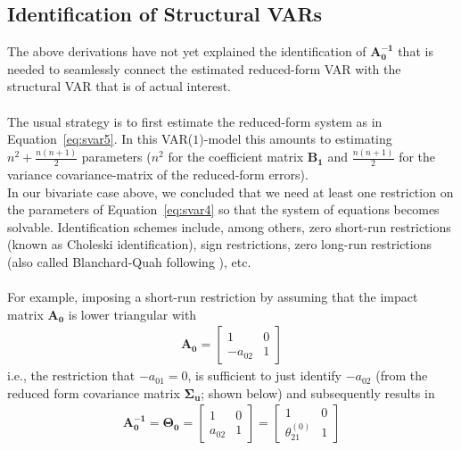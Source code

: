 \documentclass[a4paper,11pt,listof=nochaptergap,oneside,pointednumbers,bibtotoc,bigheadings,liststotoc]{scrbook}
\theoremstyle{mysatz}
\theoremstyle{mydefinition}
\theoremstyle{mybemerkung}
\newcommand{\vect}[1]{\boldsymbol{\mathbf{#1}}}
\begin{document}
\begin{itemize}
\subsection{Identification of Structural VARs}
The above derivations have not yet explained the identification of $\vect{A_0^{-1}}$ that is needed to seamlessly connect the estimated reduced-form VAR with the structural VAR that is of actual interest. \\
\\
The usual strategy is to first estimate the reduced-form system as in Equation~\ref{eq:svar5}. In this VAR($1$)-model this amounts to estimating $n^2 + \frac{n(n+1)}{2}$ parameters ($n^2$ for the coefficient matrix $\vect{B_1}$ and $\frac{n(n+1)}{2}$ for the variance covariance-matrix of the reduced-form errors). 
\\
In our bivariate case above, we concluded that we need at least one restriction on the parameters of Equation~\ref{eq:svar4} so that the system of equations becomes solvable. Identification schemes include, among others, zero short-run restrictions (known as Choleski identification), sign restrictions, zero long-run restrictions (also called Blanchard-Quah following \citealp{blanchardandquah:89}), etc.\\
\\
For example, imposing a short-run restriction by assuming that the impact matrix $\vect{A_0}$ is lower triangular with
\begin{equation} \label{eq:svar11}
\begin{split}
 		\vect{A_0} = 	\begin{bmatrix}
    					1 & 0 \\
					-a_{02} & 1
 					\end{bmatrix}
\end{split}								
\end{equation}
i.e., the restriction that $-a_{01}=0$, is sufficient to just identify $-a_{02}$ (from the reduced form covariance matrix $\vect{\Sigma_u}$; shown below) and subsequently results in 
\begin{equation} \label{eq:svar12}
\begin{split}
 		\vect{A_0^{-1}} = \vect{\Theta_0} = 	
					\begin{bmatrix}
    					1 & 0 \\
					a_{02} & 1
 					\end{bmatrix} = 
						\begin{bmatrix}
    						1 & 0 \\
						\theta_{21}^{(0)} & 1

\end{bmatrix}
\end{split}
\end{equation}
\end{itemize}
\end{document}
